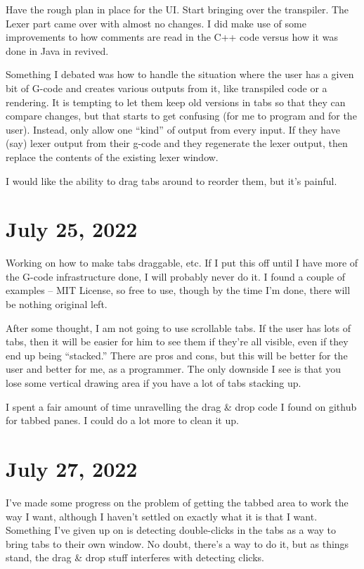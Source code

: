 \documentclass{article}
\begin{document}
Have the rough plan in place for the UI. Start bringing over the
transpiler. The Lexer part came over with almost no changes. I did
make use of some improvements to how comments are read in the C++ code
versus how it was done in Java in revived.

Something I debated was how to handle the situation where the user has
a given bit of G-code and creates various outputs from it, like
transpiled code or a rendering. It is tempting to let them keep old
versions in tabs so that they can compare changes, but that starts to
get confusing (for me to program and for the user). Instead, only
allow one ``kind'' of output from every input. If they have (say)
lexer output from their g-code and they regenerate the lexer output,
then replace the contents of the existing lexer window.

I would like the ability to drag tabs around to reorder them, but it's
painful. 

\section{July 25, 2022}

Working on how to make tabs draggable, etc. If I put this off until I
have more of the G-code infrastructure done, I will probably never do
it. I found a couple of examples -- MIT License, so free to use,
though by the time I'm done, there will be nothing original left.

After some thought, I am not going to use scrollable tabs. If the user
has lots of tabs, then it will be easier for him to see them if
they're all visible, even if they end up being ``stacked.'' There are
pros and cons, but this will be better for the user and better for me,
as a programmer. The only downside I see is that you lose some
vertical drawing area if you have a lot of tabs stacking up.

I spent a fair amount of time unravelling the drag \& drop code I
found on github for tabbed panes. I could do a lot more to clean it
up.

\section{July 27, 2022}

I've made some progress on the problem of getting the tabbed area to
work the way I want, although I haven't settled on exactly what it is
that I want. Something I've given up on is detecting double-clicks in
the tabs as a way to bring tabs to their own window. No doubt, there's
a way to do it, but as things stand, the drag \& drop stuff interferes
with detecting clicks.
\end{document}
